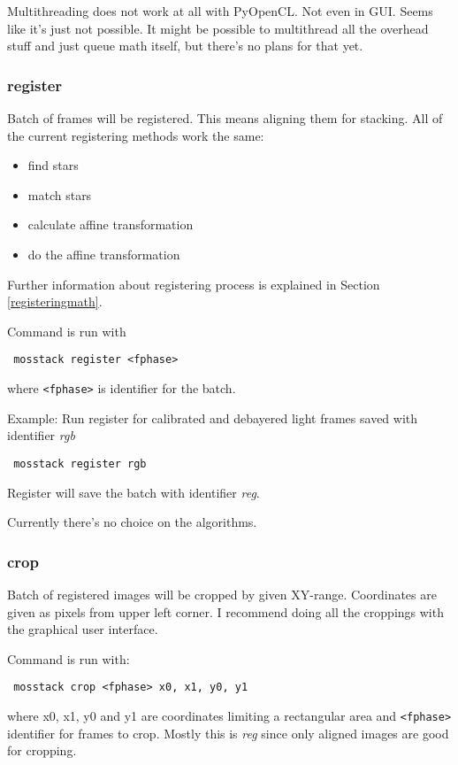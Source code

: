 \documentclass[twoside,a4paper]{refart}
\begin{document}
Multithreading does not work at all with PyOpenCL. Not even in GUI. Seems like it's just not possible. It
might be possible to multithread all the overhead stuff and just queue math itself, but there's no plans
for that yet.

\subsubsection{register}
\label{registering}
Batch of frames will be registered. This means aligning them for stacking. All of the current registering
methods work the same:
\begin{itemize}
 \item find stars
 \item match stars
 \item calculate affine transformation
 \item do the affine transformation
\end{itemize}

Further information about registering process is explained in Section \ref{registeringmath}.

Command is run with
\begin{verbatim}
 mosstack register <fphase>
\end{verbatim}

where \texttt{<fphase>} is identifier for the batch.

Example: Run register for calibrated and debayered light frames saved with identifier \textit{rgb}
\begin{verbatim}
 mosstack register rgb
\end{verbatim}

Register will save the batch with identifier \textit{reg}.

Currently there's no choice on the algorithms.

\subsubsection{crop}
\label{cropping}
Batch of registered images will be cropped by given XY-range. Coordinates are given as pixels from upper
left corner. I recommend doing all the croppings with the graphical user interface.

Command is run with:
\begin{verbatim}
 mosstack crop <fphase> x0, x1, y0, y1
\end{verbatim}

where x0, x1, y0 and y1 are coordinates limiting a rectangular area and \texttt{<fphase>} identifier for 
frames to crop. Mostly this is \textit{reg} since only aligned images are good for cropping.
\end{document}
